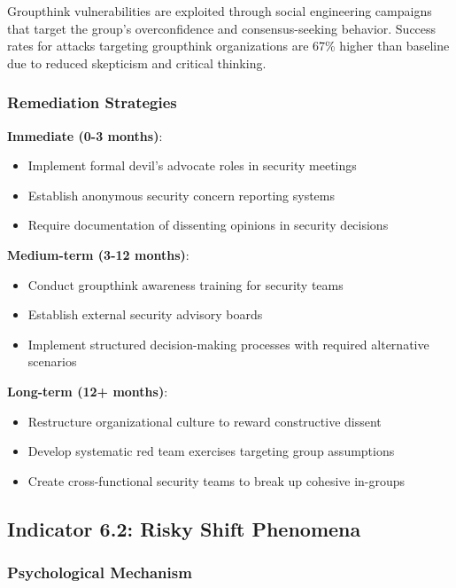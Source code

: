 \documentclass[11pt,a4paper]{article}
\begin{document}
Groupthink vulnerabilities are exploited through social engineering campaigns that target the group's overconfidence and consensus-seeking behavior. Success rates for attacks targeting groupthink organizations are 67\% higher than baseline due to reduced skepticism and critical thinking.

\subsubsection{Remediation Strategies}

\textbf{Immediate (0-3 months)}:
\begin{itemize}
\item Implement formal devil's advocate roles in security meetings
\item Establish anonymous security concern reporting systems
\item Require documentation of dissenting opinions in security decisions
\end{itemize}

\textbf{Medium-term (3-12 months)}:
\begin{itemize}
\item Conduct groupthink awareness training for security teams
\item Establish external security advisory boards
\item Implement structured decision-making processes with required alternative scenarios
\end{itemize}

\textbf{Long-term (12+ months)}:
\begin{itemize}
\item Restructure organizational culture to reward constructive dissent
\item Develop systematic red team exercises targeting group assumptions
\item Create cross-functional security teams to break up cohesive in-groups
\end{itemize}

\subsection{Indicator 6.2: Risky Shift Phenomena}

\subsubsection{Psychological Mechanism}
\end{document}
